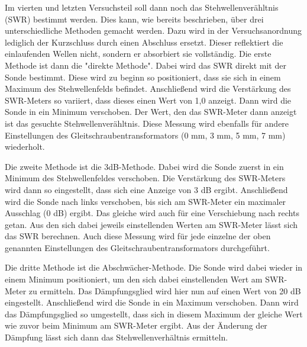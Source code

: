 Im vierten und letzten Versuchsteil soll dann noch das Stehwellenverähltnis (SWR) bestimmt werden.
Dies kann, wie bereits beschrieben, über drei unterschiedliche Methoden gemacht werden.
Dazu wird in der Versuchsanordnung lediglich der Kurzschluss durch einen Abschluss ersetzt.
Dieser reflektiert die einlaufenden Wellen nicht, sondern er absorbiert sie vollständig.
Die erste Methode ist dann die "direkte Methode". Dabei wird das SWR direkt mit der
Sonde bestimmt. Diese wird zu beginn so positioniert, dass sie sich in einem
Maximum des Stehwellenfelds befindet. Anschließend wird die Verstärkung des SWR-Meters
so variiert, dass dieses einen Wert von 1,0 anzeigt. Dann wird die Sonde in ein Minimum
verschoben. Der Wert, den das SWR-Meter dann anzeigt ist das gesuchte Stehwellenverähltnis.
Diese Messung wird ebenfalls für andere Einstellungen des Gleitschraubentransformators
(0 mm, 3 mm, 5 mm, 7 mm) wiederholt.

Die zweite Methode ist die 3dB-Methode. Dabei wird die Sonde zuerst in ein Minimum
des Stehwellenfeldes verschoben. Die Verstärkung des SWR-Meters wird dann so eingestellt,
dass sich eine Anzeige von 3 dB ergibt. Anschließend wird die Sonde nach links verschoben,
bis sich am SWR-Meter ein maximaler Ausschlag (0 dB) ergibt. Das gleiche wird auch für
eine Verschiebung nach rechts getan. Aus den sich dabei jeweils einstellenden Werten am SWR-Meter
lässt sich das SWR berechnen. Auch diese Messung wird für jede einzelne der oben genannten Einstellungen
des Gleitschraubentransformators durchgeführt.

Die dritte Methode ist die Abschwächer-Methode. Die Sonde wird dabei wieder in einem
Minimum positioniert, um den sich dabei einstellenden Wert am SWR-Meter zu ermitteln.
Das Dämpfungsglied wird hier nun auf einen Wert von 20 dB eingestellt.
Anschließend wird die Sonde in ein Maximum verschoben. Dann wird das Dämpfungsglied
so umgestellt, dass sich in diesem Maximum der gleiche Wert wie zuvor beim Minimum
am SWR-Meter ergibt. Aus der Änderung der Dämpfung lässt sich dann das Stehwellenverhältnis
ermitteln.
